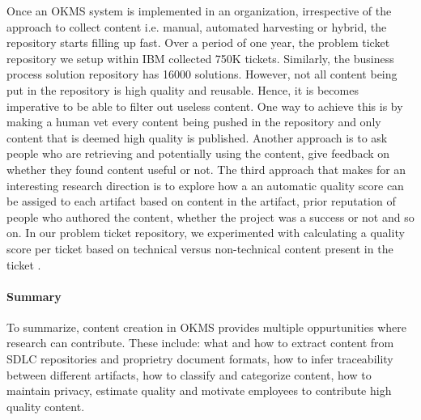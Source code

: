Once an OKMS system is implemented in an organization, irrespective of the approach to collect content i.e. manual, automated harvesting or hybrid, the repository starts filling up fast. Over a period of one year, the problem ticket repository we setup within IBM collected 750K tickets. Similarly, the business process solution repository has 16000 solutions. However, not all content being put in the repository is high quality and reusable. Hence, it is becomes imperative to be able to filter out useless content. One way to achieve this is by making a human vet every content being pushed in the repository and only content that is deemed high quality is published. Another approach is to ask people who are retrieving and potentially using the content, give feedback on whether they found content useful or not. The third approach that makes for an interesting research direction is to explore how a an automatic quality score can be assiged to each artifact based on content in the artifact, prior reputation of people who authored the content, whether the project was a success or not and so on. In our problem ticket repository, we experimented with calculating a quality score per ticket based on technical versus non-technical content present in the ticket \cite{Majumdar:2011}.


\paragraph*{Summary} To summarize, content creation in OKMS provides multiple oppurtunities where research can contribute. These include: what and how to extract content from SDLC repositories and proprietry document formats, how to infer traceability between different artifacts, how to classify and categorize content, how to maintain privacy, estimate quality and motivate employees to contribute high quality content. 
